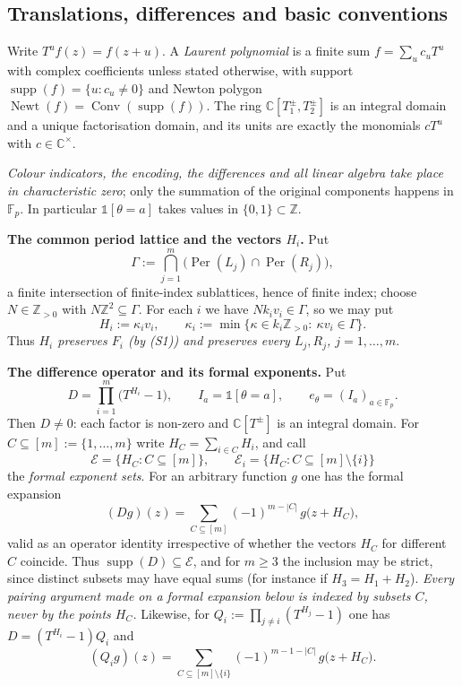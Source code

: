 \documentclass[11pt,reqno]{amsart}
\theoremstyle{plain}
\theoremstyle{definition}
\theoremstyle{remark}
\theoremstyle{plain}
\theoremstyle{remark}
\theoremstyle{definition}
\numberwithin{equation}{section}
\DeclareMathOperator{\Per}{Per}
\DeclareMathOperator{\Conv}{Conv}
\DeclareMathOperator{\supp}{supp}
\DeclareMathOperator{\Newt}{Newt}
\newcommand{\Z}{\mathbb{Z}}
\newcommand{\C}{\mathbb{C}}
\newcommand{\Fp}{\mathbb{F}_p}
\newcommand{\one}{\mathbb{1}}
\newcommand{\cE}{\mathcal{E}}
\begin{document}
\subsection{Translations, differences and basic conventions}\label{ssec:conv}

Write $T^uf(z)=f(z+u)$.  A \emph{Laurent polynomial} is a finite sum
$f=\sum_uc_uT^u$ with complex coefficients unless stated otherwise, with support
$\supp(f)=\{u:c_u\ne0\}$ and Newton polygon $\Newt(f)=\Conv(\supp(f))$.  The
ring $\C[T_1^{\pm},T_2^{\pm}]$ is an integral domain and a unique factorisation
domain, and its units are exactly the monomials $cT^u$ with $c\in\C^\times$.

\emph{Colour indicators, the encoding, the differences and all linear algebra
take place in characteristic zero}; only the summation of the original
components happens in $\Fp$.  In particular $\one[\theta=a]$ takes values in
$\{0,1\}\subset\Z$.

\smallskip\noindent\textbf{The common period lattice and the vectors $H_i$.}
Put
\[\Gamma:=\bigcap_{j=1}^m\bigl(\Per(L_j)\cap\Per(R_j)\bigr),\]
a finite intersection of finite-index sublattices, hence of finite index; choose
$N\in\Z_{>0}$ with $N\Z^2\subseteq\Gamma$.  For each $i$ we have
$Nk_iv_i\in\Gamma$, so we may put
\[H_i:=\kappa_iv_i,\qquad
  \kappa_i:=\min\{\kappa\in k_i\Z_{>0}:\ \kappa v_i\in\Gamma\}.\]
Thus \emph{$H_i$ preserves $F_i$ (by \textup{(S1)}) and preserves every
$L_j,R_j$, $j=1,\dots,m$}.

\smallskip\noindent\textbf{The difference operator and its formal exponents.}
Put
\[D=\prod_{i=1}^m\bigl(T^{H_i}-1\bigr),\qquad
  I_a=\one[\theta=a],\qquad e_\theta=(I_a)_{a\in\Fp}.\]
Then $D\ne0$: each factor is non-zero and $\C[T^{\pm}]$ is an integral domain.
For $C\subseteq[m]:=\{1,\dots,m\}$ write $H_C=\sum_{i\in C}H_i$, and call
\[\cE=\{H_C:C\subseteq[m]\},\qquad
  \cE_i=\{H_C:C\subseteq[m]\setminus\{i\}\}\]
the \emph{formal exponent sets}.  For an arbitrary function $g$ one has the
formal expansion
\begin{equation}
(Dg)(z)=\sum_{C\subseteq[m]}(-1)^{m-|C|}\,g\bigl(z+H_C\bigr),
\label{eq:Dexp}
\end{equation}
valid as an operator identity irrespective of whether the vectors $H_C$ for
different $C$ coincide.  Thus $\supp(D)\subseteq\cE$, and for $m\ge3$ the
inclusion may be strict, since distinct subsets may have equal sums (for
instance if $H_3=H_1+H_2$).  \emph{Every pairing argument made on a formal
expansion below is indexed by subsets $C$, never by the points $H_C$.}
Likewise, for $Q_i:=\prod_{j\ne i}(T^{H_j}-1)$ one has $D=(T^{H_i}-1)Q_i$ and
\begin{equation}
(Q_ig)(z)=\sum_{C\subseteq[m]\setminus\{i\}}(-1)^{m-1-|C|}\,g\bigl(z+H_C\bigr).
\label{eq:Qexp}
\end{equation}
\end{document}
